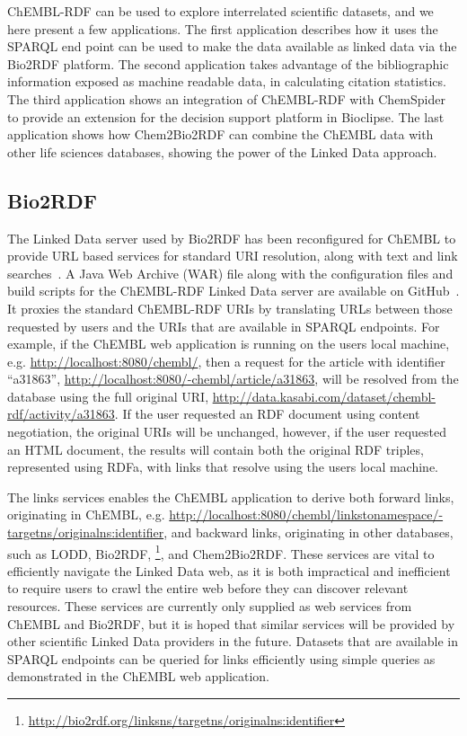 \documentclass[10pt]{bmc_article}
\newenvironment{bmcformat}{\begin{raggedright}\baselineskip20pt\sloppy\setboolean{publ}{false}}{\end{raggedright}\baselineskip20pt\sloppy}
\begin{document}
\begin{bmcformat}
ChEMBL-RDF can be used to explore interrelated scientific datasets, and we here present a few applications. 
The first application describes how it uses the SPARQL end point can be used to make the data available as linked data
via the Bio2RDF platform. The second application takes advantage of the bibliographic information
exposed as machine readable data, in calculating citation statistics. The third application shows
an integration of ChEMBL-RDF with ChemSpider to provide an extension for the decision support
platform in Bioclipse. The last application shows how Chem2Bio2RDF can combine the ChEMBL data
with other life sciences databases, showing the power of the Linked Data approach.

\subsection*{Bio2RDF}

The Linked Data server used by Bio2RDF has been reconfigured for ChEMBL to provide URL
based services for standard URI resolution, along with text and link searches~\cite{Ansell2011}. 
A Java Web Archive (WAR) file along with the configuration files and build scripts for the ChEMBL-RDF Linked Data server are available on GitHub~\cite{WebAppGitHub}. 
It proxies the standard ChEMBL-RDF URIs by translating URLs between those requested by users and the URIs that are available
in SPARQL endpoints. For example, if the ChEMBL web application is running on the users
local machine, e.g. \url{http://localhost:8080/chembl/}, then a request for the
article with identifier ``a31863'', \url{http://localhost:8080/-chembl/article/a31863},
will be resolved from the database using the full original URI,
\url{http://data.kasabi.com/dataset/chembl-rdf/activity/a31863}. If the
user requested an RDF document using content negotiation, the original URIs will be unchanged,
however, if the user requested an HTML document, the results will contain both the
original RDF triples, represented using RDFa, with links that resolve using the users local machine.

The links services enables the ChEMBL application to derive both forward links, originating in
ChEMBL, e.g. \url{http://localhost:8080/chembl/linkstonamespace/-targetns/originalns:identifier},
and backward links, originating in other databases, such as LODD, Bio2RDF,
\footnote{\url{http://bio2rdf.org/linksns/targetns/originalns:identifier}}, and Chem2Bio2RDF.
These services are vital to efficiently navigate the Linked Data web, as it is both
impractical and inefficient to require users to crawl the entire web before they can discover 
relevant resources. These services are currently only supplied as web services from ChEMBL and
Bio2RDF, but it is hoped that similar services will be provided by other scientific Linked Data
providers in the future. Datasets that are available in SPARQL endpoints can be queried for
links efficiently using simple queries as demonstrated in the ChEMBL web application.


\end{bmcformat}
\end{document}
